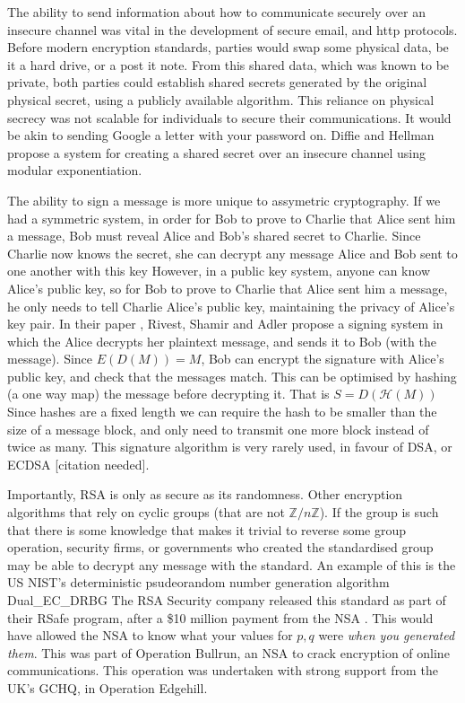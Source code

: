 \documentclass{article}
\begin{document}
The ability to send information about how to communicate securely over an insecure channel was vital in the development of secure email, and http protocols.
Before modern encryption standards, parties would swap some physical data, be it a hard drive, or a post it note.
From this shared data, which was known to be private,
both parties could establish shared secrets generated by the original physical secret,
using a publicly available algorithm.
This reliance on physical secrecy was not scalable for individuals to secure their communications.
It would be akin to sending Google a letter with your password on.
Diffie and Hellman \cite{Directions} propose a system for creating a shared secret over an insecure channel using modular exponentiation.

The ability to sign a message is more unique to assymetric cryptography.
If we had a symmetric system, in order for Bob to prove to Charlie that Alice sent him a message,
Bob must reveal Alice and Bob's shared secret to Charlie.
Since Charlie now knows the secret, she can decrypt any message Alice and Bob sent to one another with this key
However, in a public key system, anyone can know Alice's public key, so for Bob to prove to Charlie that Alice sent him a message,
he only needs to tell Charlie Alice's public key, maintaining the privacy of Alice's key pair.
In their paper \cite{RSA}, Rivest, Shamir and Adler propose a signing system
in which the Alice decrypts her plaintext message, and sends it to Bob (with the message).
Since $E(D(M)) = M$, Bob can encrypt the signature with Alice's public key, and check that the messages match.
This can be optimised by hashing (a one way map) the message before decrypting it. That is $S = D(\mathcal{H}(M))$
Since hashes are a fixed length we can require the hash to be smaller than the size of a message block,
and only need to transmit one more block instead of twice as many.
This signature algorithm is very rarely used, in favour of DSA, or ECDSA [citation needed].

Importantly, RSA is only as secure as its randomness.
Other encryption algorithms that rely on cyclic groups (that are not $\mathbb{Z}/n\mathbb{Z}$).
If the group is such that there is some knowledge that makes it trivial to reverse some group operation,
security firms, or governments who created the standardised group may be able to decrypt any message with the standard.
An example of this is the US NIST's deterministic psudeorandom number generation algorithm Dual\_EC\_DRBG
The RSA Security company released this standard as part of their RSafe program, after a \$10 million payment from the NSA \cite{Reuters}.
This would have allowed the NSA to know what your values for $p, q$ were \emph{when you generated them}.
This was part of Operation Bullrun, an NSA to crack encryption of online communications.
This operation was undertaken with strong support from the UK's GCHQ, in Operation Edgehill.
\end{document}
